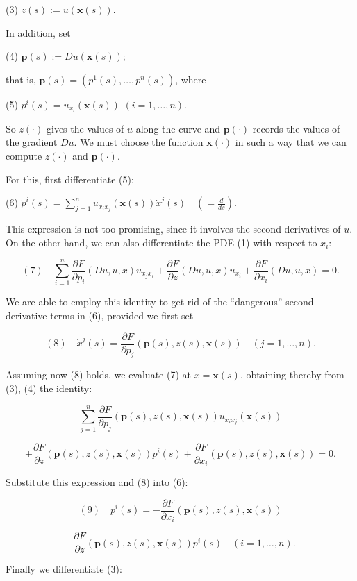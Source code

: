 (3)	$z(s) := u(\mathbf{x}(s))$.

In addition, set

(4)	$\mathbf{p}(s) := Du(\mathbf{x}(s))$;

that is, $\mathbf{p}(s) = (p^1(s), \ldots, p^n(s))$, where

(5)	$p^i(s) = u_{x_i}(\mathbf{x}(s))$ $(i = 1, \ldots, n)$.

So $z(\cdot)$ gives the values of $u$ along the curve and $\mathbf{p}(\cdot)$ records the values of the gradient $Du$. We must choose the function $\mathbf{x}(\cdot)$ in such a way that we can compute $z(\cdot)$ and $\mathbf{p}(\cdot)$.

For this, first differentiate (5):

(6)	$\dot{p}^i(s) = \sum_{j=1}^{n} u_{x_i x_j}(\mathbf{x}(s))\dot{x}^j(s) \quad \left(= \frac{d}{ds}\right)$.

This expression is not too promising, since it involves the second derivatives of $u$. On the other hand, we can also differentiate the PDE (1) with respect to $x_i$:

$$(7) \quad \sum_{i=1}^{n} \frac{\partial F}{\partial p_i}(Du, u, x)u_{x_j x_i} + \frac{\partial F}{\partial z}(Du, u, x)u_{x_i} + \frac{\partial F}{\partial x_i}(Du, u, x) = 0.$$

We are able to employ this identity to get rid of the ``dangerous'' second derivative terms in (6), provided we first set

$$(8) \quad \dot{x}^j(s) = \frac{\partial F}{\partial p_j}(\mathbf{p}(s), z(s), \mathbf{x}(s)) \quad (j = 1, \ldots, n).$$

Assuming now (8) holds, we evaluate (7) at $x = \mathbf{x}(s)$, obtaining thereby from (3), (4) the identity:

$$\sum_{j=1}^{n} \frac{\partial F}{\partial p_j}(\mathbf{p}(s), z(s), \mathbf{x}(s))u_{x_i x_j}(\mathbf{x}(s))$$

$$+ \frac{\partial F}{\partial z}(\mathbf{p}(s), z(s), \mathbf{x}(s))p^i(s) + \frac{\partial F}{\partial x_i}(\mathbf{p}(s), z(s), \mathbf{x}(s)) = 0.$$

Substitute this expression and (8) into (6):

$$(9) \quad \dot{p}^i(s) = -\frac{\partial F}{\partial x_i}(\mathbf{p}(s), z(s), \mathbf{x}(s))$$

$$- \frac{\partial F}{\partial z}(\mathbf{p}(s), z(s), \mathbf{x}(s))p^i(s) \quad (i = 1, \ldots, n).$$

Finally we differentiate (3):

